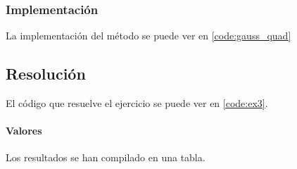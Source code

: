 \subsubsection{Implementación}

La implementación del método se puede ver en \ref{code:gauss_quad}


\subsection{Resolución}


El código que resuelve el ejercicio se puede ver en \ref{code:ex3}. 

\paragraph{Valores} Los resultados se han compilado en una tabla.


\begin{table}[H]
	\centering
\end{table}



